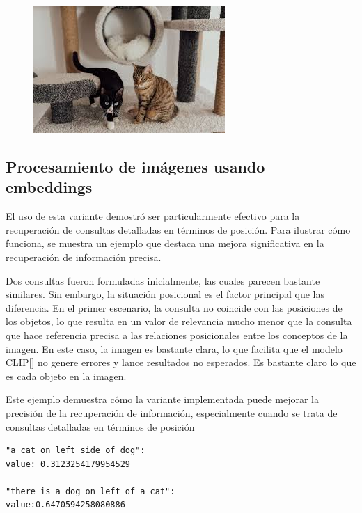 \begin{figure}
\begin{minipage}{0.3\textwidth}
 \includegraphics[width=\textwidth]{Graphics/Images/image_15.jpg}
 \caption{ }
 \label{fig:15}
\end{minipage}
\end{figure}

\subsection{Procesamiento de im\'agenes usando embeddings}
El uso de esta variante demostró ser particularmente efectivo para la recuperación de consultas detalladas en términos de posición. Para ilustrar cómo funciona, se muestra un ejemplo que destaca una mejora significativa en la recuperación de información precisa.

Dos consultas fueron formuladas inicialmente, las cuales parecen bastante similares. Sin embargo, la situación posicional es el factor principal que las diferencia. En el primer escenario, la consulta no coincide con las posiciones de los objetos, lo que resulta en un valor de relevancia mucho menor que la consulta que hace referencia precisa a las relaciones posicionales entre los conceptos de la imagen. En este caso, la imagen es bastante clara, lo que facilita que el modelo CLIP[\cite{clip}] no genere errores y lance resultados no esperados. Es bastante claro lo que es cada objeto en la imagen.

Este ejemplo demuestra cómo la variante implementada puede mejorar la precisión de la recuperación de información, especialmente cuando se trata de consultas detalladas en términos de posición

\begin{verbatim}
"a cat on left side of dog":
value: 0.3123254179954529

"there is a dog on left of a cat":
value:0.6470594258080886
\end{verbatim}

